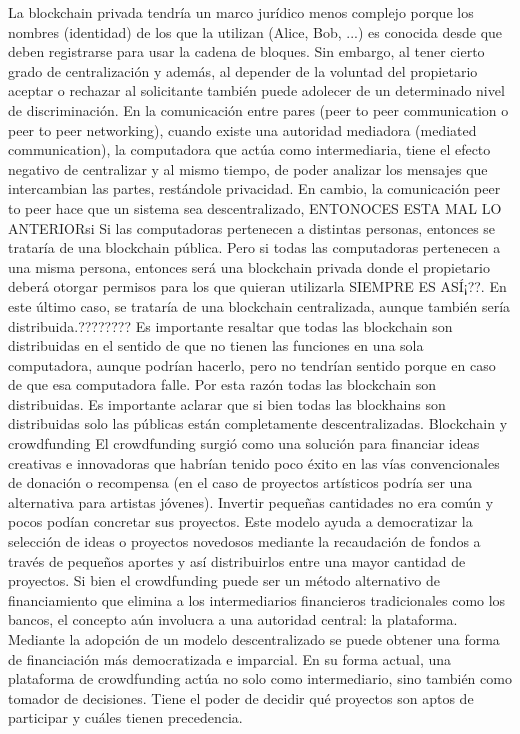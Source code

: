 \documentclass[12pt]{report} %
\begin{document}
La blockchain privada tendría un marco jurídico menos complejo porque los nombres (identidad) de los que la utilizan (Alice, Bob, ...) es conocida desde que deben registrarse para usar la cadena de bloques. Sin embargo, al tener cierto grado de centralización y además, al depender de la voluntad del propietario aceptar o rechazar al solicitante también puede adolecer de un determinado nivel de discriminación.
En la comunicación entre pares (peer to peer communication o peer to peer networking), cuando existe una autoridad mediadora (mediated communication), la computadora que actúa como intermediaria, tiene el efecto negativo de centralizar y al mismo tiempo, de poder analizar los mensajes que intercambian las partes, restándole privacidad. En cambio, la comunicación peer to peer hace que un sistema sea descentralizado, ENTONOCES ESTA MAL LO ANTERIORsi
Si las computadoras pertenecen a distintas personas, entonces se trataría de una blockchain pública. Pero si todas las computadoras pertenecen a una misma persona, entonces será una blockchain privada donde el propietario deberá otorgar  permisos para los que quieran utilizarla SIEMPRE ES ASÍ¡??. En este último caso, se trataría de una blockchain centralizada, aunque también sería distribuida.????????
Es importante resaltar que todas las blockchain son distribuidas en el sentido de que no tienen las funciones en una sola computadora, aunque podrían hacerlo, pero no tendrían sentido porque en caso de que esa computadora falle. Por esta razón todas las blockchain son distribuidas. Es importante aclarar que si bien todas las blockhains son distribuidas solo las públicas están completamente descentralizadas.
Blockchain y crowdfunding
El crowdfunding surgió como una solución para financiar ideas creativas e innovadoras que habrían tenido poco éxito en las vías convencionales de donación o recompensa (en el caso de proyectos artísticos podría ser una alternativa para artistas jóvenes). Invertir pequeñas cantidades no era común y pocos podían concretar sus proyectos. Este modelo ayuda a democratizar la selección de ideas o proyectos novedosos mediante la recaudación de fondos a través de pequeños aportes y así distribuirlos entre una mayor cantidad de proyectos. Si bien el crowdfunding puede ser un método alternativo de financiamiento que elimina a los intermediarios financieros tradicionales como los bancos, el concepto aún involucra a una autoridad central: la plataforma. Mediante la adopción de un modelo descentralizado se puede obtener una forma de financiación más democratizada e imparcial.
En su forma actual, una plataforma de crowdfunding actúa no solo como intermediario, sino también como tomador de decisiones. Tiene el poder de decidir qué proyectos son aptos de participar y cuáles tienen precedencia. 
\end{document}
